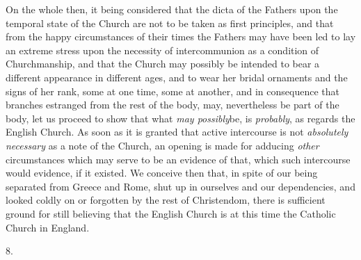 On the whole then, it being considered that the
dicta of the Fathers upon the temporal state of the Church are
not to be taken as first principles, and that from the happy
circumstances of their times the Fathers may have been led to lay an
extreme stress upon the necessity of intercommunion as a condition of
Churchmanship, and that the Church may possibly be intended to bear a
different appearance in different ages, and to wear her bridal
ornaments and the signs of her rank, some at one time, some at
another, and in consequence that branches estranged from the rest of
the body, may, nevertheless be part of the body, let us proceed to
show that what \emph{may possibly}be, is \emph{probably}, as regards
the English Church. As soon as it is granted that active intercourse
is not \emph{absolutely necessary} as a note of the Church, an opening
is made for adducing \emph{other} circumstances which may serve to be
an evidence of that, which such intercourse would evidence, if it
existed. We conceive then that, in spite of our being separated from
Greece and Rome, shut up in ourselves and our dependencies, and looked
coldly on or forgotten by the rest of Christendom, there is sufficient
ground for still believing that the English Church is at this time the
Catholic Church in England.

8.

